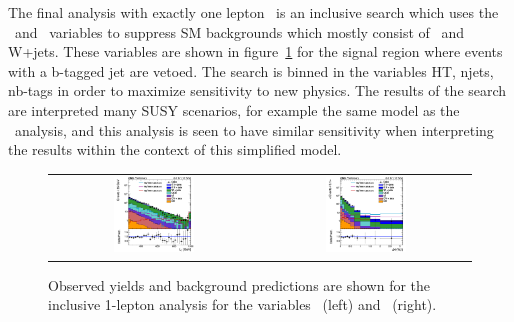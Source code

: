 The final analysis with exactly one lepton~\cite{1lincl2015} is an inclusive search
which uses the \dphiwl\ and \LT\ variables to suppress SM backgrounds which mostly consist of \ttbar\ and W+jets.
These variables are shown in figure~\ref{fig:1linclresults} for the signal region where events with a b-tagged jet are vetoed.
The search is binned in the variables HT, njets, nb-tags in order to maximize sensitivity to new physics.
The results of the search are interpreted many SUSY scenarios, for example the same model as the \MJ\ analysis,
and this analysis is seen to have similar sensitivity when interpreting the results within the context of this simplified model.

\begin{figure}[!htb]
\begin{center}
\begin{tabular}{cc}
\includegraphics[width=0.4\textwidth]{1lincl/LT.pdf} &
\includegraphics[width=0.4\textwidth]{1lincl/dphiWl.pdf}
\end{tabular}
\caption{
\label{fig:1linclresults}
Observed yields and background predictions are shown for the inclusive 1-lepton analysis
for the variables \LT\ (left) and \dphiwl\ (right).
}
\end{center}
\end{figure}

